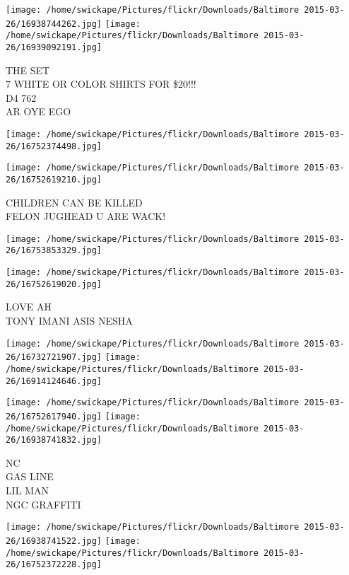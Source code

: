 \documentclass[10pt,letterpaper]{article}
\begin{document}
\texttt{[image: /home/swickape/Pictures/flickr/Downloads/Baltimore 2015-03-26/16938744262.jpg]}
\texttt{[image: /home/swickape/Pictures/flickr/Downloads/Baltimore 2015-03-26/16939092191.jpg]}

THE SET\\
7 WHITE OR COLOR SHIRTS FOR \$20!!!\\
D4 762\\
AR OYE EGO\\
\pagebreak

\texttt{[image: /home/swickape/Pictures/flickr/Downloads/Baltimore 2015-03-26/16752374498.jpg]}

\vspace{0.25in}
\texttt{[image: /home/swickape/Pictures/flickr/Downloads/Baltimore 2015-03-26/16752619210.jpg]}

CHILDREN CAN BE KILLED\\
FELON JUGHEAD U ARE WACK!\\
\pagebreak

\texttt{[image: /home/swickape/Pictures/flickr/Downloads/Baltimore 2015-03-26/16753853329.jpg]}

\vspace{0.25in}
\texttt{[image: /home/swickape/Pictures/flickr/Downloads/Baltimore 2015-03-26/16752619020.jpg]}

LOVE AH\\
TONY IMANI ASIS NESHA\\
\pagebreak

\texttt{[image: /home/swickape/Pictures/flickr/Downloads/Baltimore 2015-03-26/16732721907.jpg]}
\texttt{[image: /home/swickape/Pictures/flickr/Downloads/Baltimore 2015-03-26/16914124646.jpg]}

\texttt{[image: /home/swickape/Pictures/flickr/Downloads/Baltimore 2015-03-26/16752617940.jpg]}
\texttt{[image: /home/swickape/Pictures/flickr/Downloads/Baltimore 2015-03-26/16938741832.jpg]}

NC\\
GAS LINE\\
LIL MAN\\
NGC GRAFFITI\\
\pagebreak

\texttt{[image: /home/swickape/Pictures/flickr/Downloads/Baltimore 2015-03-26/16938741522.jpg]}
\texttt{[image: /home/swickape/Pictures/flickr/Downloads/Baltimore 2015-03-26/16752372228.jpg]}
\end{document}
